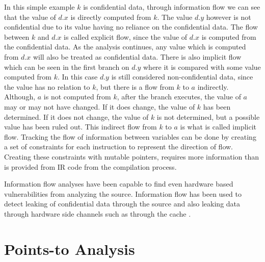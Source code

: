 In this simple example $k$ is confidential data, through information flow we
can see that the value of $d.x$ is directly computed from $k$. The value $d.y$
however is not confidential due to its value having no reliance on the
confidential data. The flow between $k$ and $d.x$ is called explicit flow,
since the value of $d.x$ is computed from the confidential data. As the
analysis continues, any value which is computed from $d.x$ will also be
treated as confidential data. There is also implicit flow which can be seen in
the first branch on $d.y$ where it is compared with some value computed from
$k$. In this case $d.y$ is still considered non-confidential data, since the
value has no relation to $k$, but there is a flow from $k$ to $a$ indirectly.
Although, $a$ is not computed from $k$, after the branch executes, the value
of $a$ may or may not have changed. If it does change, the value of $k$ has been
determined. If it does not change, the value of $k$ is not determined, but a
possible value has been ruled out. This indirect flow from $k$ to $a$ is what
is called implicit flow. Tracking the flow of information between variables can
be done by creating a set of constraints for each instruction to represent the
direction of flow. Creating these constraints with mutable pointers, requires
more information than is provided from IR code from the compilation process.

Information flow analyses have been capable to find even hardware based
vulnerabilities from analyzing the source. Information flow has been used to
detect leaking of confidential data through the source and also leaking data
through hardware side channels such as through the cache
\cite{DBLP:journals/corr/DoychevK16}.

\section{Points-to Analysis}

